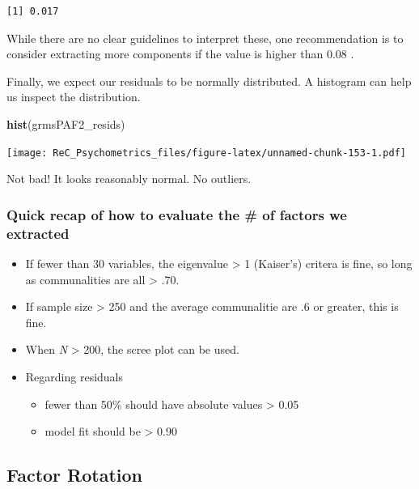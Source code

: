 \documentclass[
  english,
]{book}
\newenvironment{Shaded}{\begin{snugshade}}{\end{snugshade}}
\newcommand{\KeywordTok}[1]{\textcolor[rgb]{0.13,0.29,0.53}{\textbf{#1}}}
\newcommand{\NormalTok}[1]{#1}
\providecommand{\tightlist}{%
  \setlength{\itemsep}{0pt}\setlength{\parskip}{0pt}}
\begin{document}
\begin{verbatim}
[1] 0.017
\end{verbatim}

While there are no clear guidelines to interpret these, one recommendation is to consider extracting more components if the value is higher than 0.08 \citep{field_discovering_2012}.

Finally, we expect our residuals to be normally distributed. A histogram can help us inspect the distribution.

\begin{Shaded}
\begin{Highlighting}[]
\KeywordTok{hist}\NormalTok{(grmsPAF2_resids)}
\end{Highlighting}
\end{Shaded}

\texttt{[image: ReC\_Psychometrics\_files/figure-latex/unnamed-chunk-153-1.pdf]}

Not bad! It looks reasonably normal. No outliers.

\hypertarget{quick-recap-of-how-to-evaluate-the-of-factors-we-extracted}{%
\subsubsection{Quick recap of how to evaluate the \# of factors we extracted}\label{quick-recap-of-how-to-evaluate-the-of-factors-we-extracted}}

\begin{itemize}
\tightlist
\item
  If fewer than 30 variables, the eigenvalue \textgreater{} 1 (Kaiser's) critera is fine, so long as communalities are all \textgreater{} .70.
\item
  If sample size \textgreater{} 250 and the average communalitie are .6 or greater, this is fine.
\item
  When \emph{N} \textgreater{} 200, the scree plot can be used.
\item
  Regarding residuals

  \begin{itemize}
  \tightlist
  \item
    fewer than 50\% should have absolute values \textgreater{} 0.05
  \item
    model fit should be \textgreater{} 0.90
  \end{itemize}
\end{itemize}

\hypertarget{factor-rotation}{%
\subsection{Factor Rotation}\label{factor-rotation}}
\end{document}
